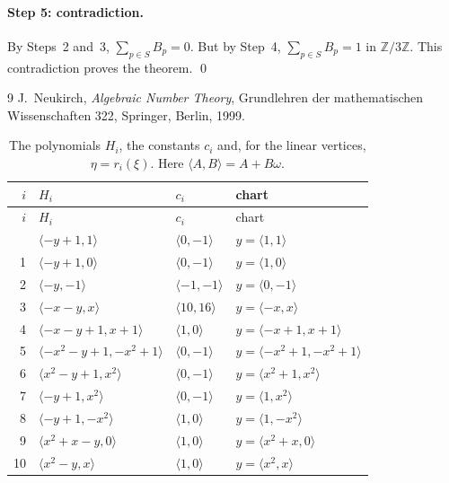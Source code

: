 \documentclass[11pt]{article}
\newcommand{\Z}{\mathbb{Z}}
\begin{document}
\paragraph{Step 5: contradiction.} By Steps~2 and~3, $\sum_{p\in S}B_p=0$. But by Step~4, $\sum_{p\in S}B_p=1$ in $\Z/3\Z$. This contradiction proves the theorem.
\qed


\begin{thebibliography}{9}
 J.~Neukirch, \emph{Algebraic Number Theory}, Grundlehren der mathematischen Wissenschaften 322, Springer, Berlin, 1999.
\end{thebibliography}

\clearpage
\begingroup\small
\setlength{\LTcapwidth}{\textwidth}
\begin{longtable}{@{}rlll@{}}
\caption{The polynomials $H_i$, the constants $c_i$ and, for the linear vertices, $\eta=r_i(\xi)$. Here $\langle A,B\rangle=A+B\omega$.}\label{tab:vert1}\\
\hline $i$ & $H_i$ & $c_i$ & chart\\\hline\endfirsthead\hline $i$ & $H_i$ & $c_i$ & chart\\\hline\endhead\hline\endfoot
0 & $\langle -y+1,1\rangle$ & $\langle 0,-1\rangle$ & $y=\langle 1,1\rangle$\\
1 & $\langle -y+1,0\rangle$ & $\langle 0,-1\rangle$ & $y=\langle 1,0\rangle$\\
2 & $\langle -y,-1\rangle$ & $\langle -1,-1\rangle$ & $y=\langle 0,-1\rangle$\\
3 & $\langle -x-y,x\rangle$ & $\langle 10,16\rangle$ & $y=\langle -x,x\rangle$\\
4 & $\langle -x-y+1,x+1\rangle$ & $\langle 1,0\rangle$ & $y=\langle -x+1,x+1\rangle$\\
5 & $\langle -x^{2}-y+1,-x^{2}+1\rangle$ & $\langle 0,-1\rangle$ & $y=\langle -x^{2}+1,-x^{2}+1\rangle$\\
6 & $\langle x^{2}-y+1,x^{2}\rangle$ & $\langle 0,-1\rangle$ & $y=\langle x^{2}+1,x^{2}\rangle$\\
7 & $\langle -y+1,x^{2}\rangle$ & $\langle 0,-1\rangle$ & $y=\langle 1,x^{2}\rangle$\\
8 & $\langle -y+1,-x^{2}\rangle$ & $\langle 1,0\rangle$ & $y=\langle 1,-x^{2}\rangle$\\
9 & $\langle x^{2}+x-y,0\rangle$ & $\langle 1,0\rangle$ & $y=\langle x^{2}+x,0\rangle$\\
10 & $\langle x^{2}-y,x\rangle$ & $\langle 1,0\rangle$ & $y=\langle x^{2},x\rangle$\\

\end{longtable}
\end{document}
